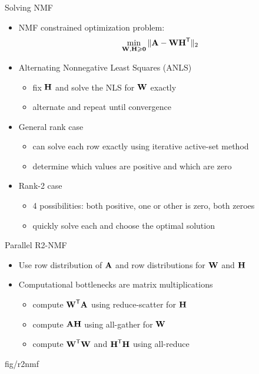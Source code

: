 \documentclass{beamer}
\begin{document}
\begin{frame}{Solving NMF}
    \begin{itemize}
        \item NMF constrained optimization problem: $$\min_{\M{W},\M{H}\geq \M{0}} \|\M{A} - \M{W}\M{H}^\Tra\|_2$$
        
        \vfill
        
        \item Alternating Nonnegative Least Squares (ANLS)
        \begin{itemize}
            \item fix $\M{H}$ and solve the NLS for $\M{W}$ exactly
            \item alternate and repeat until convergence
        \end{itemize}
        
        \vfill

        \item General rank case
        \begin{itemize}
            \item can solve each row exactly using iterative active-set method
            \item determine which values are positive and which are zero
        \end{itemize}
        
        \vfill
        
         \item Rank-2 case
        \begin{itemize}
            \item 4 possibilities: both positive, one or other is zero, both zeroes 
            \item quickly solve each and choose the optimal solution
        \end{itemize}
    \end{itemize}
\end{frame}

\begin{frame}{Parallel R2-NMF}
    \begin{itemize}
        \item Use row distribution of $\M{A}$ and row distributions for $\M{W}$ and $\M{H}$ 
        \item Computational bottlenecks are matrix multiplications
        \begin{itemize}
            \item compute $\M{W}^\Tra\M{A}$ using reduce-scatter for $\M{H}$
            \item compute $\M{A}\M{H}$ using all-gather for $\M{W}$
            \item compute $\M{W}^\Tra\M{W}$ and $\M{H}^\Tra\M{H}$ using all-reduce
        \end{itemize}
    \end{itemize}
        {fig/r2nmf}
\end{frame}
\end{document}
